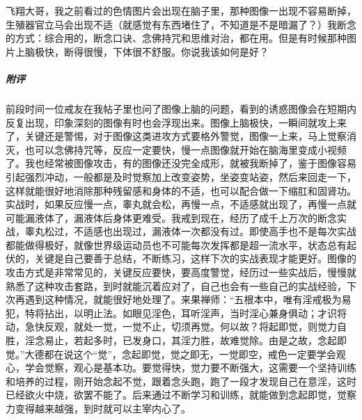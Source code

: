 \begin{case}
    飞翔大哥，我之前看过的色情图片会出现在脑子里，那种图像一出现不容易断掉，生殖器官立马会出现不适（就感觉有东西堵住了，不知道是不是暗漏了？）我断念的方式：综合用的，断念口诀、念佛持咒和思维对治，都在用。但是有时候那种图片上脑极快，断得很慢，下体很不舒服。你说我该如何是好？
    \subparagraph{附评} 前段时间一位戒友在我帖子里也问了图像上脑的问题，看到的诱惑图像会在短期内反复出现，印象深刻的图像有时也会浮现出来。图像上脑极快，一瞬间就攻上来了，关键还是警惕，对于图像这类进攻方式要格外警觉，图像一上来，马上觉察消灭，也可以念佛持咒等，反应一定要快，慢一点图像就开始在脑海里变成小视频了。我也经常被图像攻击，有的图像还没完全成形，就被我断掉了，鉴于图像容易引起强烈冲动，一般都是及时觉察加上改变姿势，坐姿变站姿，然后来回走一下，这样就能很好地消除那种残留感和身体的不适，也可以配合做一下缩肛和固肾功。实战时，如果反应慢一点，睾丸就会松，再慢一点，不适感就出现了，再慢一点就可能漏液体了，漏液体后身体更难受。我戒到现在，经历了成千上万次的断念实战，睾丸松过，不适感也出现过，漏液体一次都没有过。即使高手也不是每次实战都能做得极好，就像世界级运动员也不可能每次发挥都是超一流水平，状态总有起伏的，关键是自己要善于总结，不断练习，这样下次的实战表现才能更好。图像的攻击方式是非常常见的，关键反应要快，要高度警觉，经历过一些实战后，慢慢就熟悉了这种攻击套路，到时就能沉着应对了，自己也会有一些自己的实战经验，下次再遇到这种情况，就能很好地处理了。来果禅师：“五根本中，唯有淫戒极为易犯，特将拈出，以明止法。如眼见淫色，耳听淫声，当时淫心兼身俱动；才识将动，急快反观，就处一觉，一觉不止，切须再觉。何以故？将起即觉，则觉力自胜，淫念易止，若起多时，已发身口，其淫力胜，故难觉除。由是之故，念起即觉。”大德都在说这个“觉”，念起即觉，觉之即无，一觉即空，戒色一定要学会观心，学会觉察，观心是基本功。要觉得快，觉力要不断强大，这需要一个坚持训练和培养的过程，刚开始念起不觉，跟着念头跑，跑了一段才发现自己在意淫，这时已经欲火中烧，欲罢不能了。后来通过不断学习和训练，就能做到念起即觉，觉察力变得越来越强，到时就可以主宰内心了。
\end{case}

